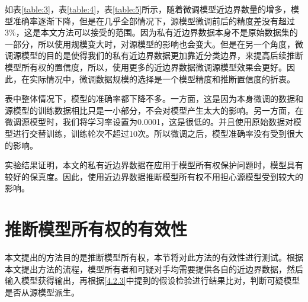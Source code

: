 如表\ref{table:3}，表\ref{table:4}，表\ref{table:5}所示，随着微调模型近边界数量的增多，模型准确率逐渐下降，但是在几乎全部情况下，源模型微调前后的精度差没有超过3\%，这是本文方法可以接受的范围。因为私有近边界数据本身不是原始数据集的一部分，所以使用规模变大时，对源模型的影响也会变大。但是在另一个角度，微调源模型的目的是使得我们的私有近边界数据更加靠近分类边界，来提高后续推断模型所有权的置信度，所以，使用更多的近边界数据微调源模型效果会更好。因此，在实际情况中，微调数据规模的选择是一个模型精度和推断置信度的折衷。

表中整体情况下，模型的准确率都下降不多。一方面，这是因为本身微调的数据和源模型的训练数据相比只是一小部分，不会对模型产生太大的影响。另一方面，在微调源模型时，我们将学习率设置为0.0001，这是很低的。并且使用原始数据对模型进行交替训练，训练轮次不超过10次。所以微调之后，模型准确率没有受到很大的影响。

实验结果证明，本文的私有近边界数据在应用于模型所有权保护问题时，模型具有较好的保真度。因此，使用近边界数据推断模型所有权不用担心源模型受到较大的影响。	
	

\section{推断模型所有权的有效性}\label{5.5}

本文提出的方法目的是推断模型所有权，本节将对此方法的有效性进行测试。根据本文提出方法的流程，模型所有者和可疑对手均需要提供各自的近边界数据，然后输入模型获得输出，再根据\ref{4.2.3}中提到的假设检验进行结果比对，判断可疑模型是否从源模型派生。

